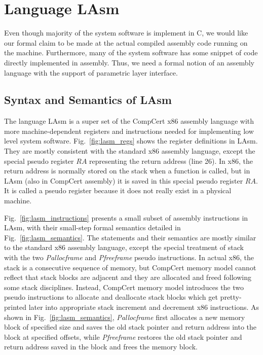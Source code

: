 \section{Language LAsm}
Even though majority of the system software is implement in C,
we would like our formal claim to be made at the actual compiled assembly
code running on the machine. Furthermore, many of the system software
has some snippet of code directly implemented in assembly.
Thus, we need a formal notion of an assembly language with
the support of parametric layer interface.

\subsection{Syntax and Semantics of LAsm}

The language LAsm is a super set of the CompCert x86 assembly language with more
machine-dependent registers and instructions needed for implementing
low level system software. 
Fig.~\ref{fig:lasm_regs} shows the register definitions in LAsm.
They are mostly consistent with the standard x86 assembly language,
except the special pseudo register $RA$ representing the return
address (line 26). In x86, the return address is normally stored
on the stack when a function is called, but in LAsm (also in
CompCert assembly) it is saved in this special pseudo register $RA$.
It is called a pseudo register because it does not really exist
in a physical machine. 

Fig.~\ref{fig:lasm_instructions} presents a small subset of assembly
instructions in LAsm, with their small-step formal semantics
detailed in Fig.~\ref{fig:lasm_semantics}.
The statements and their semantics are
mostly similar to the standard x86 assembly language, except the
special treatment of stack with the two {\it Pallocframe} and {\it Pfreeframe}
pseudo instructions. In actual x86, the stack is a consecutive sequence
of memory, but CompCert memory model cannot reflect that stack blocks
are adjacent and they are allocated and freed following some stack disciplines.
Instead, CompCert memory model introduces the two pseudo instructions
to allocate and deallocate stack blocks which get pretty-printed later
into appropriate stack increment and decrement x86 instructions. 
As shown in Fig.~\ref{fig:lasm_semantics}, {\it Pallocframe} first allocates
a new memory block of specified size and saves the old stack pointer and return
address into the block at specified offsets, while {\it Pfreeframe} restores
the old stack pointer and return address saved in the block and frees the memory
block.

